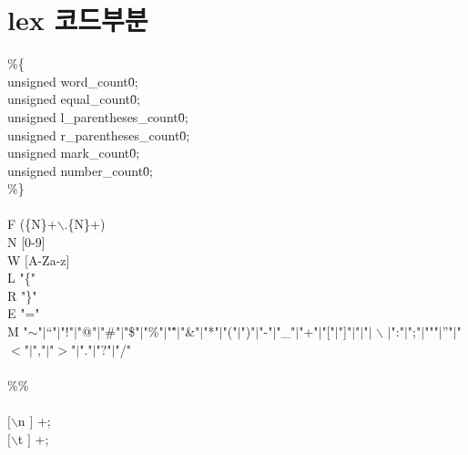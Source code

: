 \documentclass{article}
\begin{document}
\section{lex 코드부분}
\%\{ \\
\indent unsigned word\_count\=0; \\
\indent unsigned equal\_count\=0; \\
\indent unsigned l\_parentheses\_count\=0; \\
\indent unsigned r\_parentheses\_count\=0; \\
\indent unsigned mark\_count\=0; \\ 
\indent unsigned number\_count\=0; \\
\%\}\\ \\
\indent F (\{N\}+$\backslash$.\{N\}+) \\
\indent N [0-9] \\
\indent W [A-Za-z] \\
\indent L "\{" \\
\indent R "\}" \\
\indent E "=" \\ 
\indent M "$\sim$"$|$"`"$|$"!"$|$"@"$|$"\#"$|$"\$"$|$"\%"$|$"\^"$|$"\&"$|$"*"$|$"("$|$")"$|$"-"$|$"\_"$|$"+"$|$"["$|$"]"$|$"$|$"$|$
$\backslash$
$|$":"$|$";"$|$"""$|$"'"$|$"$<$"$|$","$|$"$>$"$|$"."$|$"$?$"$|$"/" \\ \\
\%\% \\ \\
$[$$\backslash$n $]$ +; \\
$[$$\backslash$t $]$ +; \\
\end{document}
